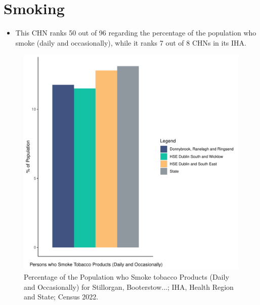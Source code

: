 \documentclass{article}
\begin{document}
\pagebreak

\section{Smoking}\label{sect:Smoking}
\begin{itemize}
\item This CHN ranks  50 out of 96 regarding the percentage of the population who smoke (daily and occasionally), while it ranks   7 out of 8 CHNs in its IHA.
\end{itemize}
\begin{figure}[H]
	\centering
	\includegraphics[width = 120mm]{../figures/SmokingED.pdf}
	\caption{Percentage of the Population who Smoke tobacco Products (Daily and Occasionally) for Stillorgan, Booterstow...; IHA, Health Region and State; Census 2022.}
	\label{fig:2ae19629-1a6a-13a3-e055-000000000001}
	\end{figure}
	
\end{document}
